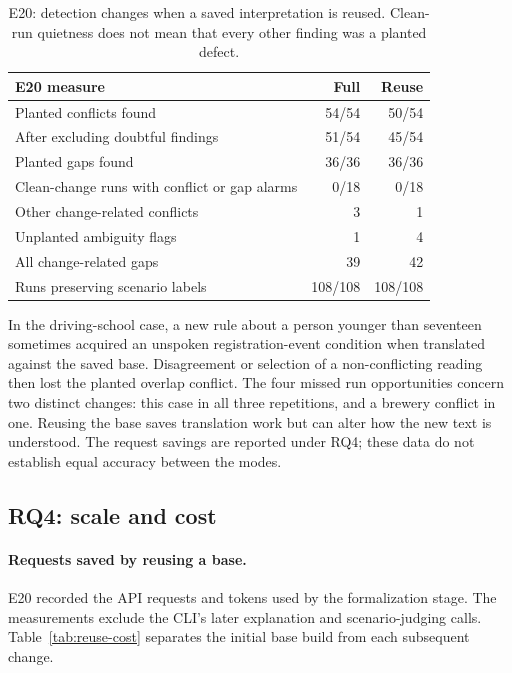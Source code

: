 \begin{table}[H]
\centering
\small
\begin{tabularx}{\linewidth}{@{}Xrr@{}}
\toprule
E20 measure & Full & Reuse \\
\midrule
Planted conflicts found & 54/54 & 50/54 \\
\quad After excluding doubtful findings & 51/54 & 45/54 \\
Planted gaps found & 36/36 & 36/36 \\
Clean-change runs with conflict or gap alarms & 0/18 & 0/18 \\
Other change-related conflicts & 3 & 1 \\
Unplanted ambiguity flags & 1 & 4 \\
All change-related gaps & 39 & 42 \\
Runs preserving scenario labels & 108/108 & 108/108 \\
\bottomrule
\end{tabularx}
\caption{E20: detection changes when a saved interpretation is reused. Clean-run quietness does not mean that every other finding was a planted defect.}
\label{tab:e20}
\end{table}

In the driving-school case, a new rule about a person younger than seventeen sometimes acquired an unspoken registration-event condition when translated against the saved base. Disagreement or selection of a non-conflicting reading then lost the planted overlap conflict. The four missed run opportunities concern two distinct changes: this case in all three repetitions, and a brewery conflict in one. Reusing the base saves translation work but can alter how the new text is understood. The request savings are reported under RQ4; these data do not establish equal accuracy between the modes.

\subsection{RQ4: scale and cost}\label{sec:rq4}

\paragraph{Requests saved by reusing a base.}
E20 recorded the API requests and tokens used by the formalization stage. The measurements exclude the CLI's later explanation and scenario-judging calls. Table~\ref{tab:reuse-cost} separates the initial base build from each subsequent change.

